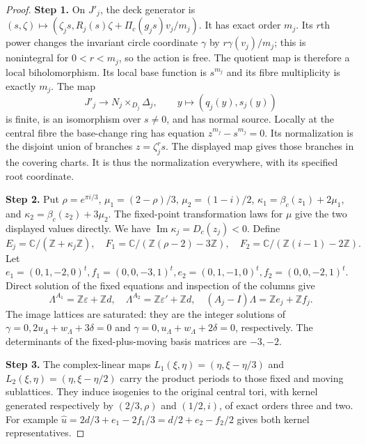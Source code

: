 \begin{proof}
\par\smallskip\noindent\textbf{Step 1.} On $J'_j$, the deck generator is
$(s,\zeta)\mapsto(\zeta_js,R_j(s)\zeta+\Pi_c(g_js)v_j/m_j)$. It has exact order $m_j$. Its $r$th power changes the invariant circle coordinate $\gamma$ by $r\gamma(v_j)/m_j$; this is nonintegral for $0<r<m_j$, so the action is free. The quotient map is therefore a local biholomorphism. Its local base function is $s^{m_j}$ and its fibre multiplicity is exactly $m_j$. The map
\[
 J'_j\longrightarrow N_j\times_{D_j}\Delta_j,\qquad y\longmapsto(q_j(y),s_j(y))
\]
is finite, is an isomorphism over $s\ne0$, and has normal source. Locally at the central fibre the base-change ring has equation $z^{m_j}-s^{m_j}=0$. Its normalization is the disjoint union of branches $z=\zeta_j^rs$. The displayed map gives those branches in the covering charts. It is thus the normalization everywhere, with its specified root coordinate.

\par\smallskip\noindent\textbf{Step 2.} Put $\rho=e^{\pi i/3}$, $\mu_1=(2-\rho)/3$, $\mu_2=(1-i)/2$, $\kappa_1=\beta_c(z_1)+2\mu_1$, and $\kappa_2=\beta_c(z_2)+3\mu_2$. The fixed-point transformation laws for $\mu$ give the two displayed values directly. We have $\operatorname{Im}\kappa_j=D_c(z_j)<0$. Define
\[
 E_j=\mathbb C/(\mathbb Z+\kappa_j\mathbb Z),\quad
 F_1=\mathbb C/(\mathbb Z(\rho-2)-3\mathbb Z),\quad
 F_2=\mathbb C/(\mathbb Z(i-1)-2\mathbb Z).
\]
Let $e_1=(0,1,-2,0)^t,f_1=(0,0,-3,1)^t,e_2=(0,1,-1,0)^t,f_2=(0,0,-2,1)^t$. Direct solution of the fixed equations and inspection of the columns give
\[
 \Lambda^{A_1}=\mathbb Z\varepsilon+\mathbb Zd,\quad
 \Lambda^{A_2}=\mathbb Z\varepsilon'+\mathbb Zd,\quad
 (A_j-I)\Lambda=\mathbb Ze_j+\mathbb Zf_j.
\]
The image lattices are saturated: they are the integer solutions of $\gamma=0,2u_{\Lambda}+w_{\Lambda}+3\delta=0$ and $\gamma=0,u_{\Lambda}+w_{\Lambda}+2\delta=0$, respectively. The determinants of the fixed-plus-moving basis matrices are $-3,-2$.

\par\smallskip\noindent\textbf{Step 3.} The complex-linear maps $L_1(\xi,\eta)=(\eta,\xi-\eta/3)$ and $L_2(\xi,\eta)=(\eta,\xi-\eta/2)$ carry the product periods to those fixed and moving sublattices. They induce isogenies to the original central tori, with kernel generated respectively by $(2/3,\rho)$ and $(1/2,i)$, of exact orders three and two. For example $\widehat u=2d/3+e_1-2f_1/3=d/2+e_2-f_2/2$ gives both kernel representatives.


\end{proof}
